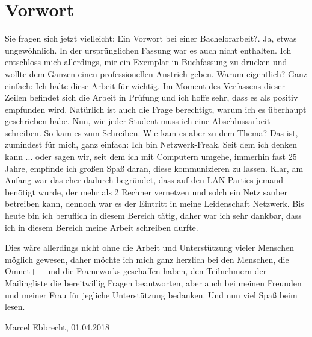 \sffamily
\thispagestyle{empty}
\section*{Vorwort}

Sie fragen sich jetzt vielleicht: \glqq Ein Vorwort bei einer Bachelorarbeit?\grqq. Ja, etwas ungewöhnlich. In der ursprünglichen Fassung war es auch nicht enthalten. Ich entschloss mich allerdings, mir ein Exemplar in Buchfassung zu drucken und wollte dem Ganzen einen professionellen Anstrich geben. Warum eigentlich? Ganz einfach: Ich halte diese Arbeit für wichtig. Im Moment des Verfassens dieser Zeilen befindet sich die Arbeit in Prüfung und ich hoffe sehr, dass es als positiv empfunden wird. Natürlich ist auch die Frage berechtigt, warum ich es überhaupt geschrieben habe. Nun, wie jeder Student muss ich eine Abschlussarbeit schreiben. So kam es zum Schreiben. Wie kam es aber zu dem Thema? Das ist, zumindest für mich, ganz einfach: Ich bin Netzwerk-Freak. Seit dem ich denken kann ... oder sagen wir, seit dem ich mit Computern umgehe, immerhin fast 25 Jahre, empfinde ich großen Spaß daran, diese kommunizieren zu lassen. Klar, am Anfang war das eher dadurch begründet, dass auf den LAN-Parties jemand benötigt wurde, der mehr als 2 Rechner vernetzen und solch ein Netz sauber betreiben kann, dennoch war es der Eintritt in meine Leidenschaft Netzwerk. Bis heute bin ich beruflich in diesem Bereich tätig, daher war ich sehr dankbar, dass ich in diesem Bereich meine Arbeit schreiben durfte.\newline

Dies wäre allerdings nicht ohne die Arbeit und Unterstützung vieler Menschen möglich gewesen, daher möchte ich mich ganz herzlich bei den Menschen, die Omnet++ und die Frameworks geschaffen haben, den Teilnehmern der Mailingliste die bereitwillig Fragen beantworten, aber auch bei meinen Freunden und meiner Frau für jegliche Unterstützung bedanken. Und nun viel Spaß beim lesen.\newline

\noindent Marcel Ebbrecht, 01.04.2018

\thispagestyle{empty}